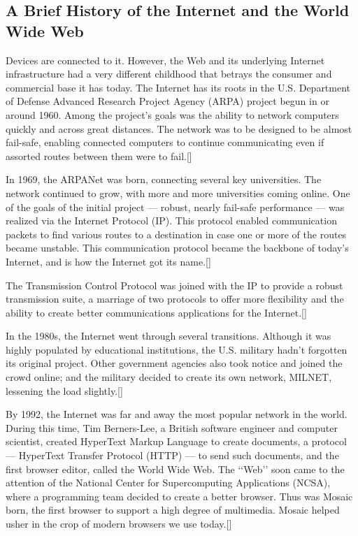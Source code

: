 \subsection*{A Brief History of the Internet and the World Wide Web}
Devices are connected to it. However, the Web and its underlying Internet infrastructure had a
very different childhood that betrays the consumer and commercial base it has today.
The Internet has its roots in the U.S. Department of Defense Advanced Research Project Agency
(ARPA) project begun in or around 1960. Among the project’s goals was the ability to network
computers quickly and across great distances. The network was to be designed to be almost
fail-safe, enabling connected computers to continue communicating even if assorted routes
between them were to fail.[\cite{7}]
\newline

In 1969, the ARPANet was born, connecting several key universities. The network continued
to grow, with more and more universities coming online. One of the goals of the initial
project — robust, nearly fail-safe performance — was realized via the Internet Protocol (IP).
This protocol enabled communication packets to find various routes to a destination in case one
or more of the routes became unstable. This communication protocol became the backbone of
today’s Internet, and is how the Internet got its name.[\cite{7}]
\newline

The Transmission Control Protocol was joined with the IP to provide a robust transmission suite,
a marriage of two protocols to offer more flexibility and the ability to create better communications
applications for the Internet.[\cite{7}]
\newline

In the 1980s, the Internet went through several transitions. Although it was highly populated by
educational institutions, the U.S. military hadn’t forgotten its original project. Other government
agencies also took notice and joined the crowd online; and the military decided to create its own
network, MILNET, lessening the load slightly.[\cite{7}]
\newline

By 1992, the Internet was far and away the most popular network in the world. During this
time, Tim Berners-Lee, a British software engineer and computer scientist, created HyperText
Markup Language to create documents, a protocol — HyperText Transfer Protocol (HTTP) — to send such documents, and the first browser editor, called the World Wide Web. The ‘‘Web’’ soon
came to the attention of the National Center for Supercomputing Applications (NCSA), where a
programming team decided to create a better browser. Thus was Mosaic born, the first browser
to support a high degree of multimedia. Mosaic helped usher in the crop of modern browsers we
use today.[\cite{7}]
\newline


